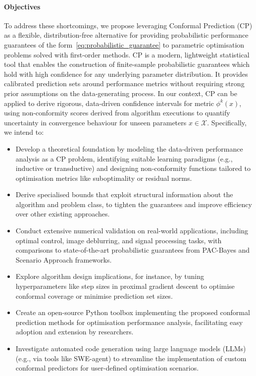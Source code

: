 \paragraph{Objectives}

To address these shortcomings, we propose leveraging Conformal Prediction (CP) as a flexible, distribution-free alternative for providing probabilistic performance guarantees of the form~\eqref{eq:probabilistic_guarantee} to parametric optimisation problems solved with first-order methods. CP is a modern, lightweight statistical tool that enables the construction of finite-sample probabilistic guarantees which hold with high confidence for any underlying parameter distribution. It provides calibrated prediction sets around performance metrics without requiring strong prior assumptions on the data-generating process. In our context, CP can be applied to derive rigorous, data-driven confidence intervals for metric $\phi^k(x)$, using non-conformity scores derived from algorithm executions to quantify uncertainty in convergence behaviour for unseen parameters $x \in \mathcal{X}$. Specifically, we intend to:
\begin{itemize}[noitemsep]
\item Develop a theoretical foundation by modeling the data-driven performance analysis as a CP problem, identifying suitable learning paradigms (e.g., inductive or transductive) and designing non-conformity functions tailored to optimisation metrics like suboptimality or residual norms.
\item Derive specialised bounds that exploit structural information about the algorithm and problem class, to tighten the guarantees and improve efficiency over other existing approaches.
\item Conduct extensive numerical validation on real-world applications, including optimal control, image deblurring, and signal processing tasks, with comparisons to state-of-the-art probabilistic guarantees from PAC-Bayes and Scenario Approach frameworks.
\item Explore algorithm design implications, for instance, by tuning hyperparameters like step sizes in proximal gradient descent to optimise conformal coverage or minimise prediction set sizes.
\item Create an open-source Python toolbox implementing the proposed conformal prediction methods for optimisation performance analysis, facilitating easy adoption and extension by researchers.
\item Investigate automated code generation using large language models (LLMs) (e.g., via tools like SWE-agent) to streamline the implementation of custom conformal predictors for user-defined optimisation scenarios.
\end{itemize}

